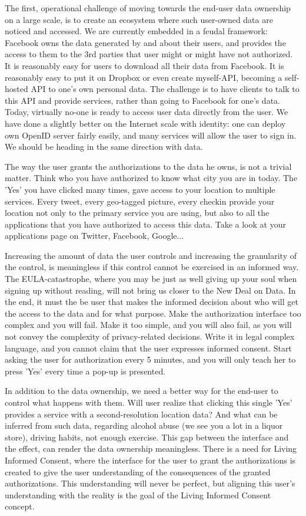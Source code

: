 The first, operational challenge of moving towards the end-user data ownership on a large scale, is to create an ecosystem where such user-owned data are noticed and accessed.
We are currently embedded in a feudal framework: Facebook owns the data generated by and about their users, and provides the access to them to the 3rd parties that user might or might have not authorized. 
It is reasonably easy for users to download all their data from Facebook. 
It is reasonably easy to put it on Dropbox or even create myself-API, becoming a self-hosted API to one's own personal data. 
The challenge is to have clients to talk to this API and provide services, rather than going to Facebook for one's data. 
Today, virtually no-one is ready to access user data directly from the user. 
We have done a slightly better on the Internet scale with identity: one can deploy own OpenID server fairly easily, and many services will allow the user to sign in. We should be heading in the same direction with data.

The way the user grants the authorizations to the data he owns, is not a trivial matter.
Think who you have authorized to know what city you are in today. 
The 'Yes' you have clicked many times, gave access to your location to multiple services.
Every tweet, every geo-tagged picture, every checkin provide your location not only to the primary service you are using, but also to all the applications that you have authorized to access this data.
Take a look at your applications page on Twitter, Facebook, Google...

Increasing the amount of data the user controls and increasing the granularity of the control, is meaningless if this control cannot be exercised in an informed way.
The EULA-catastrophe, where you may be just as well giving up your soul when signing up without reading, will not bring us closer to the New Deal on Data.
In the end, it must the be user that makes the informed decision about who will get the access to the data and for what purpose. 
Make the authorization interface too complex and you will fail. 
Make it too simple, and you will also fail, as you will not convey the complexity of privacy-related decisions. 
Write it in legal complex language, and you cannot claim that the user expresses informed consent. 
Start asking the user for authorization every 5 minutes, and you will only teach her to press 'Yes' every time a pop-up is presented. 

In addition to the data ownership, we need a better way for the end-user to control what happens with them. 
Will user realize that clicking this single 'Yes' provides a service with a second-resolution location data? 
And what can be inferred from such data, regarding alcohol abuse (we see you a lot in a liquor store), driving habits, not enough exercise. 
This gap between the interface and the effect, can render the data ownership meaningless. 
There is a need for Living Informed Consent, where the interface for the user to grant the authorizations is created to give the user understanding of the consequences of the granted authorizations.
This understanding will never be perfect, but aligning this user's understanding with the reality is the goal of the Living Informed Consent concept. 

